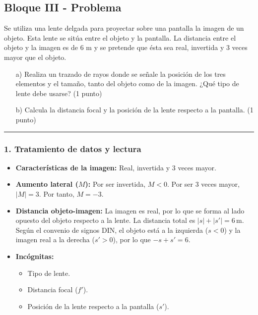 \subsection{Bloque III - Problema}
\label{subsec:A3_2017_jul_ext}

\begin{cajaenunciado}
Se utiliza una lente delgada para proyectar sobre una pantalla la imagen de un objeto. Esta lente se sitúa entre el objeto y la pantalla. La distancia entre el objeto y la imagen es de 6 m y se pretende que ésta sea real, invertida y 3 veces mayor que el objeto.
\begin{enumerate}
    \item[a)] Realiza un trazado de rayos donde se señale la posición de los tres elementos y el tamaño, tanto del objeto como de la imagen. ¿Qué tipo de lente debe usarse? (1 punto)
    \item[b)] Calcula la distancia focal y la posición de la lente respecto a la pantalla. (1 punto)
\end{enumerate}
\end{cajaenunciado}
\hrule

\subsubsection*{1. Tratamiento de datos y lectura}
\begin{itemize}
    \item \textbf{Características de la imagen:} Real, invertida y 3 veces mayor.
    \item \textbf{Aumento lateral ($M$):} Por ser invertida, $M<0$. Por ser 3 veces mayor, $|M|=3$. Por tanto, $M = -3$.
    \item \textbf{Distancia objeto-imagen:} La imagen es real, por lo que se forma al lado opuesto del objeto respecto a la lente. La distancia total es $|s| + |s'| = 6\,\text{m}$. Según el convenio de signos DIN, el objeto está a la izquierda ($s<0$) y la imagen real a la derecha ($s'>0$), por lo que $-s+s'=6$.
    \item \textbf{Incógnitas:}
    \begin{itemize}
        \item Tipo de lente.
        \item Distancia focal ($f'$).
        \item Posición de la lente respecto a la pantalla ($s'$).
    \end{itemize}
\end{itemize}


